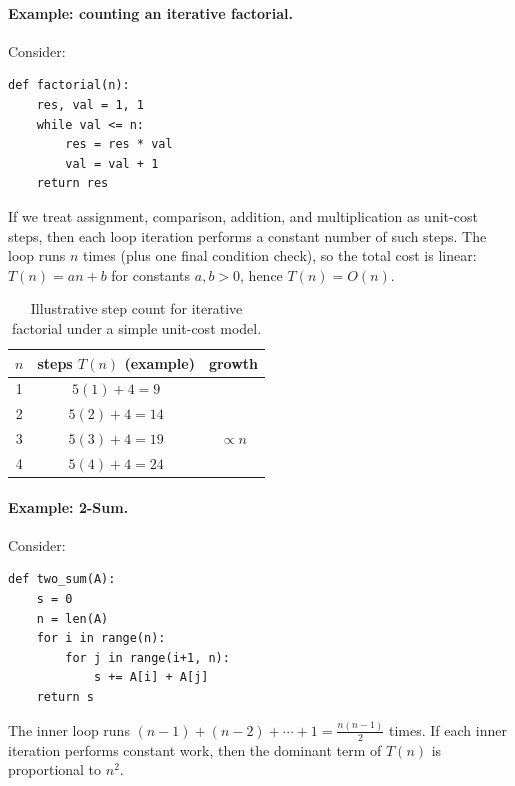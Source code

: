 \documentclass[12pt]{scrartcl}
\begin{document}
\paragraph{Example: counting an iterative factorial.}
Consider:
\begin{lstlisting}
def factorial(n):
    res, val = 1, 1
    while val <= n:
        res = res * val
        val = val + 1
    return res
\end{lstlisting}

If we treat assignment, comparison, addition, and multiplication as unit-cost steps, then each loop iteration performs a constant number of such steps. The loop runs \(n\) times (plus one final condition check), so the total cost is linear: \(T(n)=an+b\) for constants \(a,b>0\), hence \(T(n)=O(n)\).

\begin{table}[h]
	\centering
	\caption{Illustrative step count for iterative factorial under a simple unit-cost model.}
	\begin{tabular}{@{}c c c@{}}
		\toprule
		\(n\) & steps \(T(n)\) (example) & growth        \\ \midrule
		1     & \(5(1)+4=9\)             &               \\
		2     & \(5(2)+4=14\)            &               \\
		3     & \(5(3)+4=19\)            & \(\propto n\) \\
		4     & \(5(4)+4=24\)            &               \\ \bottomrule
	\end{tabular}
\end{table}

\paragraph{Example: 2-Sum.}
Consider:
\begin{lstlisting}
def two_sum(A):
    s = 0
    n = len(A)
    for i in range(n):
        for j in range(i+1, n):
            s += A[i] + A[j]
    return s
\end{lstlisting}

The inner loop runs \((n-1)+(n-2)+\cdots+1=\frac{n(n-1)}{2}\) times. If each inner iteration performs constant work, then the dominant term of \(T(n)\) is proportional to \(n^2\).
\end{document}
